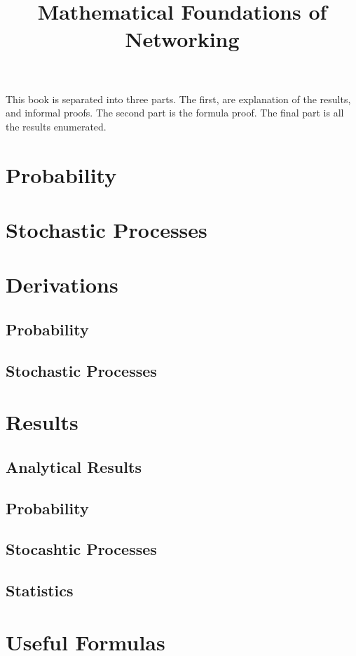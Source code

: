 \documentclass[letterpaper,12pt]{article}
\title{Mathematical Foundations of Networking}
\begin{document}
\raggedright

\setlength{\columnseprule}{0.5pt}
\setcounter{tocdepth}{4}
\setcounter{secnumdepth}{6}
\tableofcontents

This book is separated into three parts. The first, are explanation of the
results, and informal proofs. The second part is the formula proof. The final
part is all the results enumerated.

\newpage
\section{Probability}


\newpage
\section{Stochastic Processes}


\newpage
\section{Derivations}
\subsection{Probability}

\subsection{Stochastic Processes}


\newpage
\setlength{\parskip}{-3mm}
\section{Results}
\subsection{Analytical Results}

\subsection{Probability}

\subsection{Stocashtic Processes}

\subsection{Statistics}



\newpage
\section{Useful Formulas}

\end{document}
